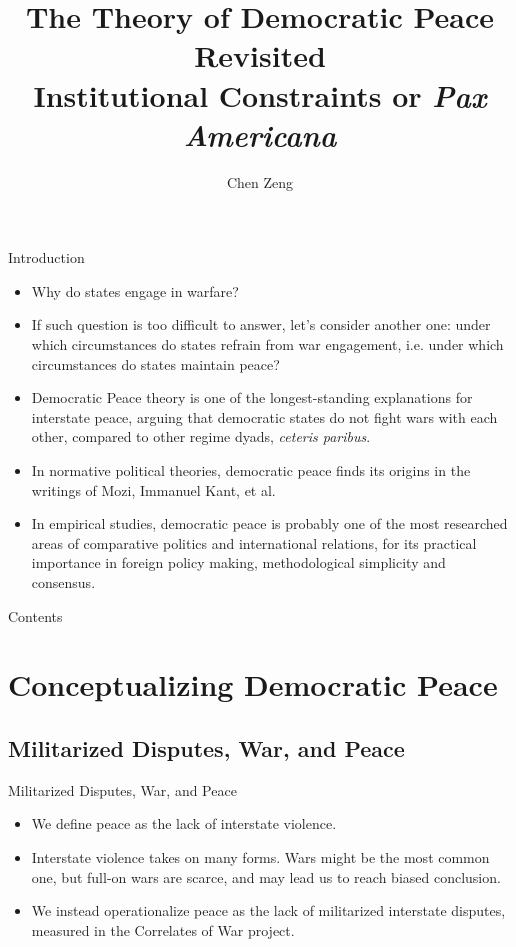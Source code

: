 \documentclass{beamer}
\title[Democratic Peace Revisited]{The Theory of Democratic Peace Revisited \\ \large{Institutional Constraints or \textit{Pax Americana}}}
\author{Chen Zeng}
\institute[]{Department of Political Science \\ Renmin University of China}
\begin{document}
	\maketitle
	
	\begin{frame}{Introduction}
		\begin{itemize}
			\item Why do states engage in warfare?
			\item If such question is too difficult to answer, let's consider another one: under which circumstances do states refrain from war engagement, i.e. under which circumstances do states maintain peace?
			\item Democratic Peace theory is one of the longest-standing explanations for interstate peace, arguing that democratic states do not fight wars with each other, compared to other regime dyads, \textit{ceteris paribus}.
			\item In normative political theories, democratic peace finds its origins in the writings of Mozi, Immanuel Kant, et al.
			\item In empirical studies, democratic peace is probably one of the most researched areas of comparative politics and international relations, for its practical importance in foreign policy making, methodological simplicity and consensus.
		\end{itemize}
	\end{frame}
	
	\begin{frame}{Contents}
		\tableofcontents
	\end{frame}

	\section{Conceptualizing Democratic Peace}
	
	\subsection{Militarized Disputes, War, and Peace}
	
	\begin{frame}{Militarized Disputes, War, and Peace}
		\begin{itemize}
			\item We define peace as the lack of interstate violence.
			\item Interstate violence takes on many forms. Wars might be the most common one, but full-on wars are scarce, and may lead us to reach biased conclusion.
			\item We instead operationalize peace as the lack of militarized interstate disputes, measured in the Correlates of War project.
		\end{itemize}
	\end{frame}
\end{document}
